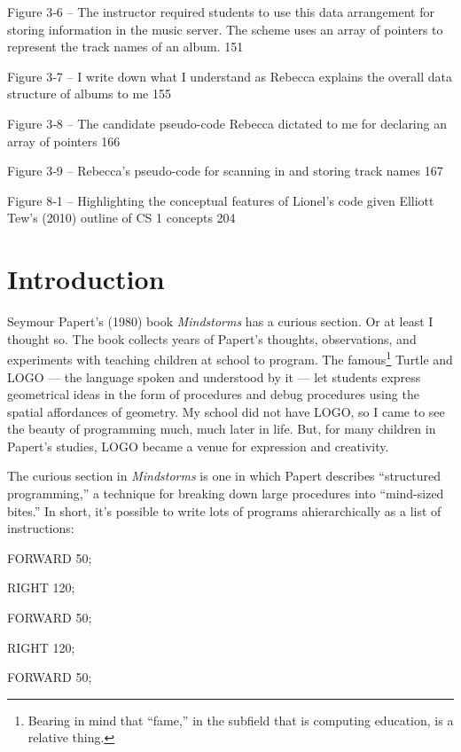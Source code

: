 Figure 3‑6 -- The instructor required students to use this data
arrangement for storing information in the music server. The scheme uses
an array of pointers to represent the track names of an album. 151

Figure 3‑7 -- I write down what I understand as Rebecca explains the
overall data structure of albums to me 155

Figure 3‑8 -- The candidate pseudo-code Rebecca dictated to me for
declaring an array of pointers 166

Figure 3‑9 -- Rebecca's pseudo-code for scanning in and storing track
names 167

Figure 8‑1 -- Highlighting the conceptual features of Lionel's code
given Elliott Tew's (2010) outline of CS 1 concepts 204

\section{}\label{section}

\section{Introduction}\label{introduction}

Seymour Papert's (1980) book \emph{Mindstorms} has a curious section. Or
at least I thought so. The book collects years of Papert's thoughts,
observations, and experiments with teaching children at school to
program. The famous\footnote{Bearing in mind that ``fame,'' in the
  subfield that is computing education, is a relative thing.} Turtle and
LOGO --- the language spoken and understood by it --- let students
express geometrical ideas in the form of procedures and debug procedures
using the spatial affordances of geometry. My school did not have LOGO,
so I came to see the beauty of programming much, much later in life.
But, for many children in Papert's studies, LOGO became a venue for
expression and creativity.

The curious section in \emph{Mindstorms} is one in which Papert
describes ``structured programming,'' a technique for breaking down
large procedures into ``mind-sized bites.'' In short, it's possible to
write lots of programs ahierarchically as a list of instructions:

FORWARD 50;

RIGHT 120;

FORWARD 50;

RIGHT 120;

FORWARD 50;

